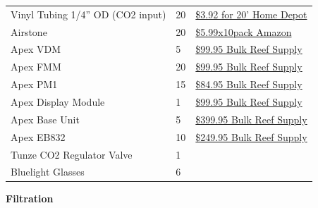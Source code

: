 \documentclass[
]{book}
\begin{document}
\begin{longtable}[]{@{}lll@{}}
Vinyl Tubing 1/4'' OD (CO2 input) & 20 & \href{https://www.homedepot.com/p/Everbilt-1-4-in-O-D-x-1-6-in-I-D-x-20-ft-Clear-PVC-Vinyl-Tubing-701968/207144351}{\$3.92 for 20' Home Depot} \\
Airstone & 20 & \href{https://www.amazon.com/Pawfly-Cylinder-Diffuser-Airstones-Hydroponics/dp/B075QCWGZQ/ref=sr_1_5?crid=3EXLLKKDA2NYZ\&keywords=airstones+for+aquariums\&qid=1572983301\&sprefix=airstone\%2Caps\%2C197\&sr=8-5}{\$5.99x10pack Amazon} \\
Apex VDM & 5 & \href{https://www.bulkreefsupply.com/led-pumps-control-module-vdm-neptune-systems.html}{\$99.95 Bulk Reef Supply} \\
Apex FMM & 20 & \href{https://www.bulkreefsupply.com/fmm-fluid-monitoring-module-neptune-systems.html}{\$99.95 Bulk Reef Supply} \\
Apex PM1 & 15 & \href{https://www.bulkreefsupply.com/ph-orp-probe-module-pm1-neptune-systems.html}{\$84.95 Bulk Reef Supply} \\
Apex Display Module & 1 & \href{https://www.bulkreefsupply.com/apex-display-module-neptune-systems.html}{\$99.95 Bulk Reef Supply} \\
Apex Base Unit & 5 & \href{https://www.bulkreefsupply.com/apex-controller-base-unit-neptune-systems.html}{\$399.95 Bulk Reef Supply} \\
Apex EB832 & 10 & \href{https://www.bulkreefsupply.com/energybar-832-neptune-systems.html}{\$249.95 Bulk Reef Supply} \\
Tunze CO2 Regulator Valve & 1 & \\
Bluelight Glasses & 6 & \\
\bottomrule
\end{longtable}

\textbf{Filtration}
\end{document}

